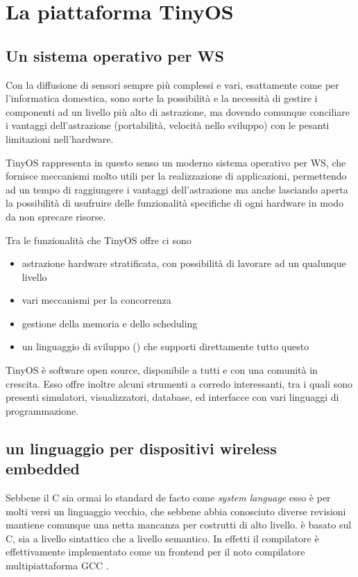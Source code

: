 \documentclass[twoside,11pt,a4paper,italian,openany]{book}
\begin{document}
\chapter{La piattaforma TinyOS}

\section{Un sistema operativo per WS}
Con la diffusione di sensori sempre più complessi e vari, esattamente come per 
l'informatica domestica, sono sorte la possibilità e la necessità di gestire i
componenti ad un livello più alto di astrazione, ma dovendo comunque conciliare 
i vantaggi dell'astrazione (portabilità, velocità nello sviluppo) con le pesanti 
limitazioni nell'hardware. 

TinyOS\cite{tinyos} rappresenta in questo senso un moderno sistema operativo per WS, 
che fornisce meccanismi molto utili per la realizzazione di applicazioni, permettendo 
ad un tempo di raggiungere i vantaggi dell'astrazione ma anche lasciando aperta la possibilità 
di usufruire delle funzionalità specifiche di ogni hardware in modo da non sprecare risorse. 

Tra le funzionalità che TinyOS offre ci sono
\begin{itemize}

\item{astrazione hardware stratificata, con possibilità di lavorare ad un qualunque livello}

\item{vari meccanismi per la concorrenza }

\item{gestione della memoria e dello scheduling}

\item{un linguaggio di sviluppo (\nesc) che supporti direttamente tutto questo}
\end{itemize}

TinyOS è software open source, disponibile a tutti e con una comunità in crescita.
Esso offre inoltre alcuni strumenti a corredo interessanti, tra i quali sono presenti 
simulatori, visualizzatori, database, ed interfacce con vari linguaggi di programmazione. 


\section{\nesc un linguaggio per dispositivi wireless embedded}

Sebbene il C sia ormai lo standard de facto come \emph{system language} esso è per molti versi 
un linguaggio vecchio, che sebbene abbia conosciuto diverse revisioni mantiene comunque una 
netta mancanza per costrutti di alto livello. 
\nesc è basato sul C, sia a livello sintattico che a livello semantico. 
In effetti il compilatore \nesc è effettivamente implementato come un frontend per il noto compilatore multipiattaforma GCC \cite{nesc}.
\end{document}
